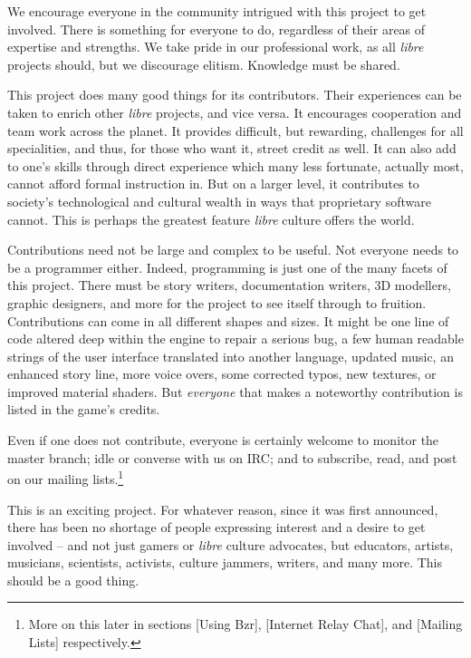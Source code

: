 
We encourage everyone in the community intrigued with this project to get involved. There is something for everyone to do, regardless of their areas of expertise and strengths. We take pride in our professional work, as all {\it libre} projects should, but we discourage elitism. Knowledge must be shared.

This project does many good things for its contributors. Their experiences can be taken to enrich other {\it libre} projects, and vice versa. It encourages cooperation and team work across the planet. It provides difficult, but rewarding, challenges for all specialities, and thus, for those who want it, street credit as well. It can also add to one's skills through direct experience which many less fortunate, actually most, cannot afford formal instruction in. But on a larger level, it contributes to society's technological and cultural wealth in ways that proprietary software cannot. This is perhaps the greatest feature {\it libre} culture offers the world.

Contributions need not be large and complex to be useful. Not everyone needs to be a programmer either. Indeed, programming is just one of the many facets of this project. There must be story writers, documentation writers, 3D modellers, graphic designers, and more for the project to see itself through to fruition. Contributions can come in all different shapes and sizes. It might be one line of code altered deep within the engine to repair a serious bug, a few human readable strings of the user interface translated into another language, updated music, an enhanced story line, more voice overs, some corrected typos, new textures, or improved material shaders. But {\it everyone} that makes a noteworthy contribution is listed in the game's credits.

Even if one does not contribute, everyone is certainly welcome to monitor the master branch; idle or converse with us on IRC; and to subscribe, read, and post on our mailing lists.\footnote{More on this later in sections \in{}[Using Bzr], \in{}[Internet Relay Chat], and \in{}[Mailing Lists] respectively.}

This is an exciting project. For whatever reason, since it was first announced, there has been no shortage of people expressing interest and a desire to get involved -- and not just gamers or {\it libre} culture advocates, but educators, artists, musicians, scientists, activists, culture jammers, writers, and many more. This should be a good thing. 

